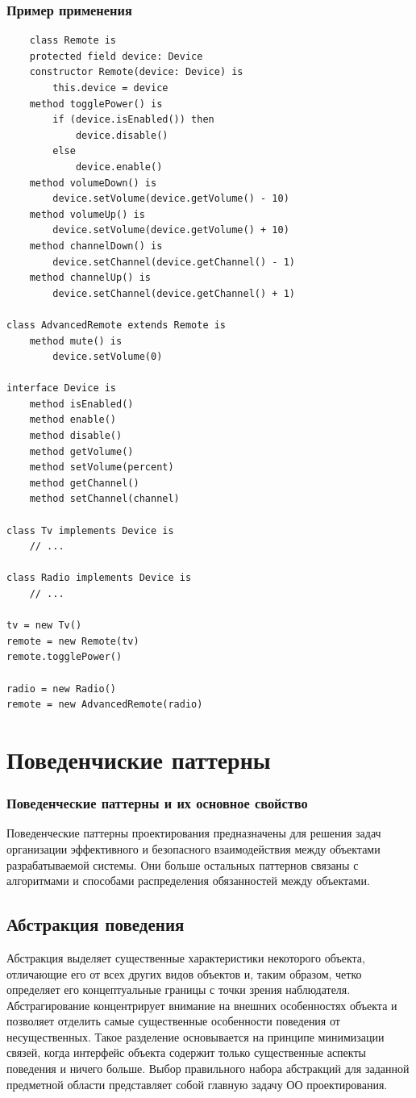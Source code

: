 \subsection{Пример применения}
\begin{lstlisting}
    class Remote is
    protected field device: Device
    constructor Remote(device: Device) is
        this.device = device
    method togglePower() is
        if (device.isEnabled()) then
            device.disable()
        else
            device.enable()
    method volumeDown() is
        device.setVolume(device.getVolume() - 10)
    method volumeUp() is
        device.setVolume(device.getVolume() + 10)
    method channelDown() is
        device.setChannel(device.getChannel() - 1)
    method channelUp() is
        device.setChannel(device.getChannel() + 1)

class AdvancedRemote extends Remote is
    method mute() is
        device.setVolume(0)

interface Device is
    method isEnabled()
    method enable()
    method disable()
    method getVolume()
    method setVolume(percent)
    method getChannel()
    method setChannel(channel)

class Tv implements Device is
    // ...

class Radio implements Device is
    // ...

tv = new Tv()
remote = new Remote(tv)
remote.togglePower()

radio = new Radio()
remote = new AdvancedRemote(radio)
\end{lstlisting}


\newpage
\chapter{Поведенчиские паттерны}

\subsection{Поведенческие паттерны и их основное свойство}
Поведенческие паттерны проектирования предназначены для решения задач организации эффективного и безопасного взаимодействия между объектами разрабатываемой системы. Они больше остальных паттернов связаны с алгоритмами и способами распределения обязанностей между объектами.

\section{Абстракция поведения}
Абстракция выделяет существенные характеристики некоторого объекта, отличающие его от всех других видов объектов и, таким образом, четко определяет его концептуальные границы с точки зрения наблюдателя.
Абстрагирование концентрирует внимание на внешних особенностях объекта и позволяет отделить самые существенные особенности поведения от несущественных. Такое разделение основывается на принципе минимизации связей, когда интерфейс объекта содержит только существенные аспекты поведения и ничего больше. Выбор правильного набора абстракций для заданной предметной области представляет собой главную задачу ОО проектирования. 

